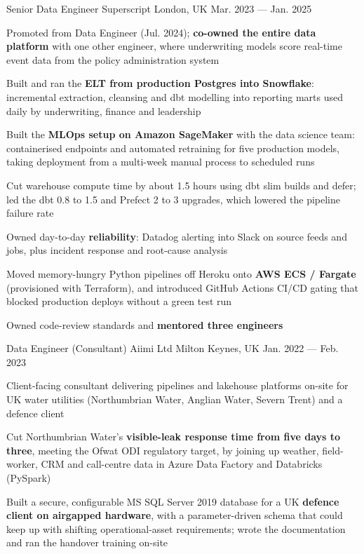 \begin{cventries}
  \cventry
  {Senior Data Engineer} %
  {Superscript } %
  {London, UK} %
  {Mar. 2023 --- Jan. 2025} %
  {
    \begin{cvitems} %
    \item {Promoted from Data Engineer (Jul. 2024); \textbf{co-owned the entire data platform} with one other engineer, where underwriting models score real-time event data from the policy administration system}
    \item {Built and ran the \textbf{ELT from production Postgres into Snowflake}: incremental extraction, cleansing and dbt modelling into reporting marts used daily by underwriting, finance and leadership}
    \item {Built the \textbf{MLOps setup on Amazon SageMaker} with the data science team: containerised endpoints and automated retraining for five production models, taking deployment from a multi-week manual process to scheduled runs}
    \item {Cut warehouse compute time by about 1.5 hours using dbt slim builds and defer; led the dbt 0.8 to 1.5 and Prefect 2 to 3 upgrades, which lowered the pipeline failure rate}
    \item {Owned day-to-day \textbf{reliability}: Datadog alerting into Slack on source feeds and jobs, plus incident response and root-cause analysis}
    \item {Moved memory-hungry Python pipelines off Heroku onto \textbf{AWS ECS / Fargate} (provisioned with Terraform), and introduced GitHub Actions CI/CD gating that blocked production deploys without a green test run}
    \item {Owned code-review standards and \textbf{mentored three engineers}}
    \end{cvitems}
  }

  \cventry
  {Data Engineer (Consultant)} %
  {Aiimi Ltd } %
  {Milton Keynes, UK} %
  {Jan. 2022 --- Feb. 2023} %
  {
    \begin{cvitems} %
    \item {Client-facing consultant delivering pipelines and lakehouse platforms on-site for UK water utilities (Northumbrian Water, Anglian Water, Severn Trent) and a defence client}
    \item {Cut Northumbrian Water's \textbf{visible-leak response time from five days to three}, meeting the Ofwat ODI regulatory target, by joining up weather, field-worker, CRM and call-centre data in Azure Data Factory and Databricks (PySpark)}
    \item {Built a secure, configurable MS SQL Server 2019 database for a UK \textbf{defence client on airgapped hardware}, with a parameter-driven schema that could keep up with shifting operational-asset requirements; wrote the documentation and ran the handover training on-site}
    \end{cvitems}
  }


\end{cventries}
